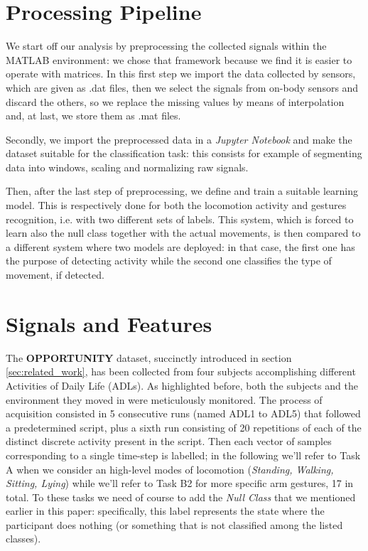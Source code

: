 
\section{Processing Pipeline}
\label{sec:processing_architecture}

We start off our analysis by preprocessing the collected signals within the MATLAB environment: we chose that framework because we find it is easier to operate with matrices. In this first step we import the data collected by sensors, which are given as .dat files, then we select the signals from on-body sensors and discard the others, so we replace the missing values by means of interpolation and, at last, we store them as .mat files.

Secondly, we import the preprocessed data in a \textit{Jupyter Notebook} and make the dataset suitable for the classification task: this consists for example of segmenting data into windows, scaling and normalizing raw signals.

Then, after the last step of preprocessing, we define and train a suitable learning model. This is respectively done for both the locomotion activity and gestures recognition, i.e. with two different sets of labels. This system, which is forced to learn also the null class together with the actual movements, is then compared to a different system where two models are deployed: in that case, the first one has the purpose of detecting activity while the second one classifies the type of movement, if detected. 

\section{Signals and Features}
\label{sec:model}

The \textbf{OPPORTUNITY} dataset, succinctly introduced in section \ref{sec:related_work}, has been collected from four subjects accomplishing different Activities of Daily Life (ADLs). As highlighted before, both the subjects and the environment they moved in were meticulously monitored.
The process of acquisition consisted in 5 consecutive runs (named ADL1 to ADL5) that followed a predetermined script, plus a sixth run consisting of 20 repetitions of each of the distinct discrete activity present in the script. Then each vector of samples corresponding to a single time-step is labelled; in the following we'll refer to Task A when we consider an high-level modes of locomotion (\textit{Standing, Walking, Sitting, Lying}) while we'll refer to Task B2 for more specific arm gestures, 17 in total. To these tasks we need of course to add the \textit{Null Class} that we mentioned earlier in this paper: specifically, this label represents the state where the participant does nothing (or something that is not classified among the listed classes). 

